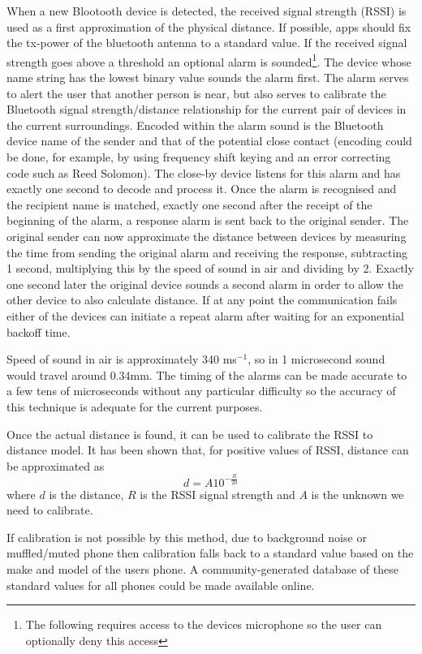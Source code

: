 \documentclass{article}
\begin{document}
When a new Blootooth device is detected, the received signal strength (RSSI) is used as a first approximation of the physical distance. If possible, apps should fix the tx-power of the bluetooth antenna to a standard value. If the received signal strength goes above a threshold an optional alarm is sounded\footnote{The following requires access to the devices microphone so the user can optionally deny this access}. The device whose name string has the lowest binary value sounds the alarm first. The alarm serves to alert the user that another person is near, but also serves to calibrate the Bluetooth signal strength/distance relationship for the current pair of devices in the current surroundings. Encoded within the alarm sound is the Bluetooth device name of the sender and that of the potential close contact (encoding could be done, for example, by using frequency shift keying and an error correcting code such as Reed Solomon). The close-by device listens for this alarm and has exactly one second to decode and process it. Once the alarm is recognised and the recipient name is matched, exactly one second after the receipt of the beginning of the alarm, a response alarm is sent back to the original sender. The original sender can now approximate the distance between devices by measuring the time from sending the original alarm and receiving the response, subtracting 1 second, multiplying this by the speed of sound in air and dividing by 2. Exactly one second later the original device sounds a second alarm in order to allow the other device to also calculate distance. If at any point the communication fails either of the devices can initiate a repeat alarm after waiting for an exponential backoff time. 

Speed of sound in air is approximately 340 ms$^{-1}$, so in 1 microsecond sound would travel around 0.34mm. The timing of the alarms can be made accurate to a few tens of microseconds without any particular difficulty so the accuracy of this technique is adequate for the current purposes.

Once the actual distance is found, it can be used to calibrate the RSSI to distance model. It has been shown\cite{zhou2006position} that, for positive values of RSSI, distance can be approximated as
\[
d = A10^{-\frac{R}{20}}
\]
where $d$ is the distance, $R$ is the RSSI signal strength and $A$ is the unknown we need to calibrate.

If calibration is not possible by this method, due to background noise or muffled/muted phone then calibration falls back to a standard value based on the make and model of the users phone. A community-generated database of these standard values for all phones could be made available online.
\end{document}
